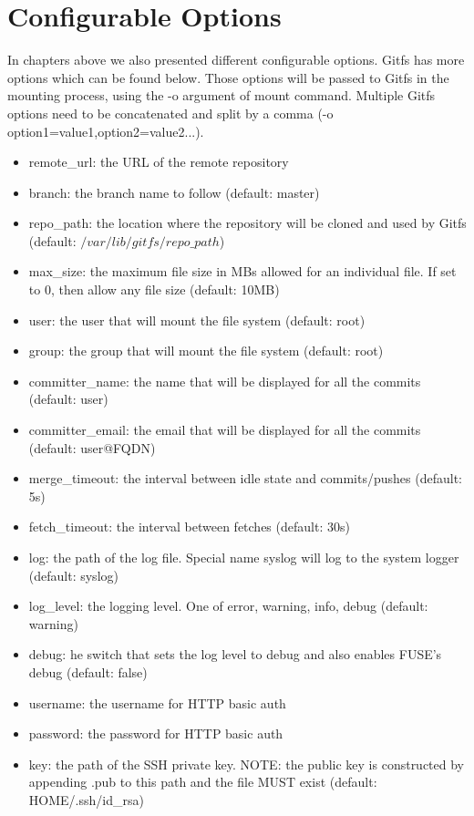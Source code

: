 \section{Configurable Options}
In chapters above we also presented different configurable options. Gitfs has more options which can be found below. Those options will be passed to Gitfs in the mounting process, using the -o argument of mount command. Multiple Gitfs options need to be concatenated and split by a comma (-o option1=value1,option2=value2...).

\begin{itemize}
    \item remote\_url: the URL of the remote repository
    \item branch: the branch name to follow (default: master)
    \item repo\_path: the location where the repository will be cloned and used by Gitfs
    (default: $/var/lib/gitfs/repo\_path$)
    \item max\_size: the maximum file size in MBs allowed for an individual file. If set to 0, then allow any file size (default: 10MB)
    \item user: the user that will mount the file system (default: root)
    \item group: the group that will mount the file system (default: root)
    \item committer\_name: the name that will be displayed for all the commits (default: user)
    \item committer\_email: the email that will be displayed for all the commits (default: user@FQDN)
    \item merge\_timeout: the interval between idle state and commits/pushes (default: 5s)
    \item fetch\_timeout: the interval between fetches (default: 30s)
    \item log: the path of the log file. Special name syslog will log to the system logger (default: syslog)
    \item log\_level: the logging level. One of error, warning, info, debug (default: warning)
    \item debug: he switch that sets the log level to debug and also enables FUSE’s debug (default: false)
    \item username: the username for HTTP basic auth
    \item password: the password for HTTP basic auth
    \item key: the path of the SSH private key. NOTE: the public key is constructed by appending .pub to this path and the file MUST exist (default: \textdollar HOME/.ssh/id\_rsa)
\end{itemize}
